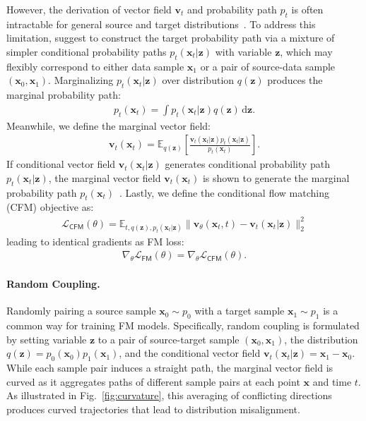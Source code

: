However, the derivation of vector field $\bm{v}_t$ and probability path $p_t$ is often intractable for general source and target distributions~\cite{tong2024improvinggeneralizingflowbasedgenerative}.  To address this limitation, \cite{tong2024improvinggeneralizingflowbasedgenerative,lipman2022flow} suggest to construct the target probability path via a mixture of simpler conditional probability paths $p_t(\bm{x}_t | \bm{z})$ with variable $\bm{z}$, which may flexibly correspond to either data sample $\bm{x}_1$ or a pair of source-data sample $(\bm{x}_0, \bm{x}_1)$.  Marginalizing $p_t(\bm{x}_t | \bm{z})$ over distribution $q(\bm{z})$ produces the marginal probability path:
\begin{align}
    p_t(\bm{x}_t) = \int p_t(\bm{x}_t | \bm{z})q(\bm{z}) \, \mathrm{d} \bm{z}.
\label{eqn:marginal_probpath}
\end{align}
Meanwhile, we define the marginal vector field: 
\begin{align}
    \bm{v}_t(\bm{x}_t) = \mathbb{E}_{q(\bm{z})} \left[ \frac{\bm{v}_t(\bm{x}_t|\bm{z})p_t(\bm{x}_t|\bm{z})}{p_t(\bm{x}_t)} \right].
\label{eqn:marginal_vecfield}
\end{align}
If conditional vector field $\bm{v}_t(\bm{x}_t|\bm{z})$ generates conditional probability path $p_t(\bm{x}_t|\bm{z})$, the marginal vector field $\bm{v}_t(\bm{x}_t)$ is shown to generate the marginal probability path $p_t(\bm{x}_t)$~\cite{tong2024improvinggeneralizingflowbasedgenerative}.  Lastly, we define the conditional flow matching (CFM) objective as:
\begin{align}
    \mathcal{L}_\textsf{CFM}(\theta) = \mathbb{E}_{t, q(\bm{z}), p_t(\bm{x}_t|\bm{z})} \|\bm{v}_\theta(\bm{x}_t, t) - \bm{v}_t(\bm{x}_t | \bm{z})\|_2^2
    \label{eqn:cfm_loss}
\end{align}
leading to identical gradients as FM loss:
\begin{align}
    \nabla_\theta \mathcal{L}_\textsf{FM}(\theta)=\nabla_\theta \mathcal{L}_\textsf{CFM}(\theta).
\end{align}

\paragraph{Random Coupling.}
Randomly pairing a source sample $\bm{x}_0 \sim p_0$ with a target sample $\bm{x}_1 \sim p_1$ is a common way for training FM models.  Specifically, random coupling is formulated by setting variable $\bm{z}$ to a pair of source-target sample $(\bm{x}_0, \bm{x}_1)$, the distribution $q(\bm{z}) = p_0(\bm{x}_0)p_1(\bm{x}_1)$, and the conditional vector field $\bm{v}_t(\bm{x}_t|\bm{z}) = \bm{x}_1 - \bm{x}_0$. While each sample pair induces a straight path, the marginal vector field is curved as it aggregates paths of different sample pairs at each point $\bm{x}$ and time $t$. As illustrated in Fig.~\ref{fig:curvature}, this averaging of conflicting directions produces curved trajectories that lead to distribution misalignment.


